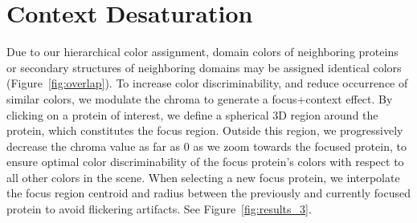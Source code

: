 \documentclass{egpubl}
\begin{document}
	

	
	
	\section{Context Desaturation}
	\label{sec:chroma}
	
	
	Due to our hierarchical color assignment, domain colors of neighboring proteins or secondary structures of neighboring domains may be assigned identical colors (Figure~\ref{fig:overlap}).
	To increase color discriminability, and reduce occurrence of similar colors, we modulate the chroma to generate a focus+context effect. 
	By clicking on a protein of interest, we define a spherical 3D region around the protein, which constitutes the focus region. 
	Outside this region, we progressively decrease the chroma value as far as 0 as we zoom towards the focused protein, to ensure optimal color discriminability of the focus protein's colors with respect to all other colors in the scene. 
	When selecting a new focus protein, we interpolate the focus region centroid and radius between the previously and currently focused protein to avoid flickering artifacts. See Figure~\ref{fig:results_3}.

	
	
	
\end{document}
